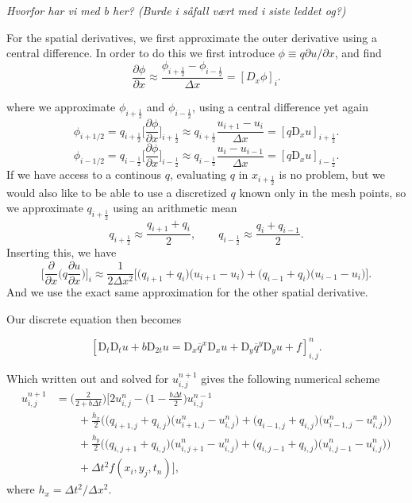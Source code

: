 \documentclass[a4paper, 11pt, notitlepage, english]{article}
\newcommand{\p}{\partial}
\newcommand{\D}{\mbox{D}}
\begin{document}
\textit{Hvorfor har vi med b her? (Burde i såfall vært med i siste leddet og?)}

For the spatial derivatives, we first approximate the outer derivative using a central difference. In order to do this we first introduce $\phi \equiv q \p u/\p x$, and find
$$\frac{\p \phi}{\p x} \approx \frac{\phi_{i+\frac{1}{2}} - \phi_{i-\frac{1}{2}}}{\Delta x} = [D_x \phi]_{i}.$$

where we approximate $\phi_{i+\frac{1}{2}}$ and $\phi_{i-\frac{1}{2}}$, using a central difference yet again
$$\phi_{i+1/2} = q_{i+\frac{1}{2}}\bigg[\frac{\p \phi}{\p x}\bigg]_{i+\frac{1}{2}} \approx q_{i+\frac{1}{2}} \frac{u_{i+1} - u_{i}}{\Delta x} = [q\D_x u]_{i+\frac{1}{2}}.$$
$$\phi_{i-1/2} = q_{i-\frac{1}{2}}\bigg[\frac{\p \phi}{\p x}\bigg]_{i-\frac{1}{2}} \approx q_{i-\frac{1}{2}} \frac{u_{i} - u_{i-1}}{\Delta x} = [q\D_x u]_{i-\frac{1}{2}}.$$
If we have access to a continous $q$, evaluating $q$ in $x_{i+\frac{1}{2}}$ is no problem, but we would also like to be able to use a discretized $q$ known only in the mesh points, so we approximate $q_{i+\frac{1}{2}}$ using an arithmetic mean
$$q_{i+\frac{1}{2}} \approx \frac{q_{i+1} + q_i}{2}, \qquad q_{i-\frac{1}{2}} \approx \frac{q_{i} + q_{i-1}}{2}.$$
Inserting this, we have
$$\bigg[\frac{\p}{\p x}\bigg(q\frac{\p u}{\p x}\bigg)\bigg]_i \approx \frac{1}{2\Delta x^2}\bigg[\big(q_{i+1}+q_i\big)\big(u_{i+1}-u_i\big) + \big(q_{i-1} + q_i\big)\big(u_{i-1}-u_i\big)\bigg].$$
And we use the exact same approximation for the other spatial derivative.

Our discrete equation then becomes

$$[\D_t\D_t u + b\D_{2t}u = \D_x \overline{q}^{x}\D_x u + \D_y \overline{q}^y \D_y u + f]^{n}_{i,j}.$$

Which written out and solved for $u_{i,j}^{n+1}$ gives the following numerical scheme
\begin{align*}
u_{i,j}^{n+1} &= \bigg(\frac{2}{2+b\Delta t}\bigg)\Bigg[2u_{i,j}^n - \bigg(1-\frac{b\Delta t}{2}\bigg)u_{i,j}^{n-1} \\ 
&\qquad + \frac{h_x}{2}\bigg(\big(q_{i+1,j}+q_{i,j}\big)\big(u_{i+1,j}^n-u_{i,j}^n\big) + \big(q_{i-1,j} + q_{i,j}\big)\big(u_{i-1,j}^n-u_{i,j}^n\big)\bigg) \\
&\qquad + \frac{h_y}{2}\bigg(\big(q_{i,j+1}+q_{i,j}\big)\big(u_{i,j+1}^n-u_{i,j}^n\big) + \big(q_{i,j-1} + q_{i,j}\big)\big(u_{i,j-1}^n-u_{i,j}^n\big)\bigg) \\
&\qquad + \Delta t^2 f(x_i, y_j, t_n) \bigg],
\end{align*}
where $h_x = \Delta t^2/\Delta x^2$.
\end{document}
